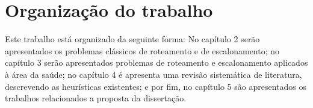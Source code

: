 \section{Organização do trabalho}
Este trabalho está organizado da seguinte forma: No capítulo 2 serão apresentados os problemas clássicos de roteamento e de escalonamento; no capítulo 3 serão apresentados problemas de roteamento e escalonamento aplicados à área da saúde; no capítulo 4 é apresenta uma revisão sistemática de literatura, descrevendo as heurísticas existentes; e por fim, no capítulo 5 são apresentados os trabalhos relacionados a proposta da dissertação. 
    



 



  	
